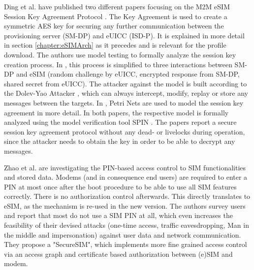 Ding et al. have published two different papers focusing on the M2M eSIM Session Key Agreement Protocol \parencite{Ding:SecAnalySPIN} \parencite{Ding:FormAnalSessionKey}. The Key Agreement is used to create a symmetric \acrshort{AES} key for securing any further communication between the provisioning server (SM-DP) and eUICC (ISD-P). It is explained in more detail in section \ref{chapter:eSIMArch} as it precedes and is relevant for the profile download. The authors use model testing to formally analyze the session key creation process. In \parencite{Ding:SecAnalySPIN}, this process is simplified to three interactions between SM-DP and eSIM (random challenge by eUICC, encrypted response from SM-DP, shared secret from eUICC). The attacker against the model is built according to the Dolev-Yao Attacker \parencite{Dolev:Yao}, which can always intercept, modify, replay or store any messages between the targets.
In \parencite{Ding:FormAnalSessionKey}, Petri Nets are used to model the session key agreement in more detail.
In both papers, the respective model is formally analyzed using the model verification tool SPIN \parencite{SPIN}. The papers report a secure session key agreement protocol without any dead- or livelocks during operation, since the attacker needs to obtain the key in order to be able to decrypt any messages.

Zhao et al. \parencite{Zhao:SecureSIM} are investigating the PIN-based access control to \acrshort{SIM} functionalities and stored data. Modems (and in consequence end users) are required to enter a PIN at most once after the boot procedure to be able to use all SIM features correctly. There is no authorization control afterwards. This directly translates to eSIM, as the mechanism is re-used in the new version. The authors survey users and report that most do not use a SIM PIN at all, which even increases the feasibility of their devised attacks (one-time access, traffic eavesdropping, Man in the middle and impersonation) against user data and network communication. They propose a "SecureSIM", which implements more fine grained access control via an access graph and certificate based authorization between (e)SIM and modem.

